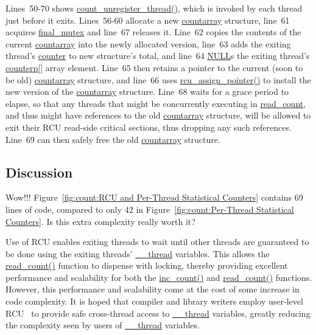 Lines~50-70 shows \url{count_unregister_thread()}, which is invoked
by each thread just before it exits.
Lines~56-60 allocate a new \url{countarray} structure,
line~61 acquires \url{final_mutex} and line~67 releases it.
Line~62 copies the contents of the current \url{countarray} into
the newly allocated version, line~63 adds the exiting thread's \url{counter}
to new structure's total, and line~64 \url{NULL}s the exiting thread's
\url{counterp[]} array element.
Line~65 then retains a pointer to the current (soon to be old)
\url{countarray} structure, and line~66 uses \url{rcu_assign_pointer()}
to install the new version of the \url{countarray} structure.
Line~68 waits for a grace period to elapse, so that any threads that
might be concurrently executing in \url{read_count}, and thus might
have references to the old \url{countarray} structure, will be allowed
to exit their RCU read-side critical sections, thus dropping any such
references.
Line~69 can then safely free the old \url{countarray} structure.

\subsection{Discussion}

\QuickQuiz{}
	Wow!!!
	Figure~\ref{fig:count:RCU and Per-Thread Statistical Counters}
	contains 69 lines of code, compared to only 42 in
	Figure~\ref{fig:count:Per-Thread Statistical Counters}.
	Is this extra complexity really worth it?
 \QuickQuizEnd

Use of RCU enables exiting threads to wait until other threads are
guaranteed to be done using the exiting threads' \url{__thread} variables.
This allows the \url{read_count()} function to dispense with locking,
thereby providing
excellent performance and scalability for both the \url{inc_count()}
and \url{read_count()} functions.
However, this performance and scalability come at the cost of some increase
in code complexity.
It is hoped that compiler and library writers employ user-level
RCU~\cite{MathieuDesnoyers2009URCU} to provide safe cross-thread
access to \url{__thread} variables, greatly reducing the
complexity seen by users of \url{__thread} variables.

